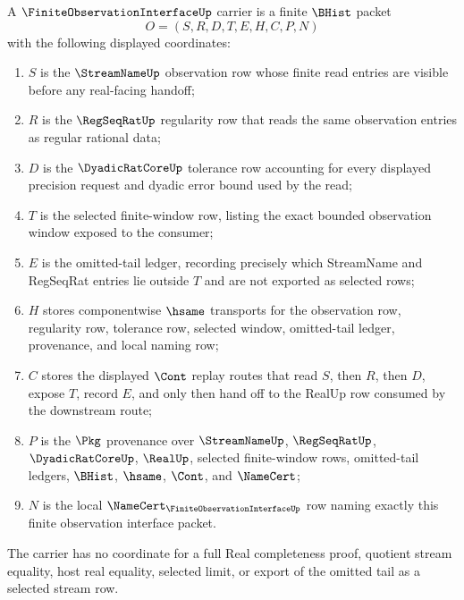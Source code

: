 \begin{definition}
\label{def:finite-observation-interface-carrier}
A $\FiniteObservationInterfaceUp$ carrier is a finite $\BHist$ packet
$$
O=(S,R,D,T,E,H,C,P,N)
$$
with the following displayed coordinates:
\begin{enumerate}
\item $S$ is the $\StreamNameUp$ observation row whose finite read entries are visible before any real-facing handoff;
\item $R$ is the $\RegSeqRatUp$ regularity row that reads the same observation entries as regular rational data;
\item $D$ is the $\DyadicRatCoreUp$ tolerance row accounting for every displayed precision request and dyadic error bound used by the read;
\item $T$ is the selected finite-window row, listing the exact bounded observation window exposed to the consumer;
\item $E$ is the omitted-tail ledger, recording precisely which StreamName and RegSeqRat entries lie outside $T$ and are not exported as selected rows;
\item $H$ stores componentwise $\hsame$ transports for the observation row, regularity row, tolerance row, selected window, omitted-tail ledger, provenance, and local naming row;
\item $C$ stores the displayed $\Cont$ replay routes that read $S$, then $R$, then $D$, expose $T$, record $E$, and only then hand off to the RealUp row consumed by the downstream route;
\item $P$ is the $\Pkg$ provenance over $\StreamNameUp$, $\RegSeqRatUp$, $\DyadicRatCoreUp$, $\RealUp$, selected finite-window rows, omitted-tail ledgers, $\BHist$, $\hsame$, $\Cont$, and $\NameCert$;
\item $N$ is the local $\NameCert_{\FiniteObservationInterfaceUp}$ row naming exactly this finite observation interface packet.
\end{enumerate}
The carrier has no coordinate for a full Real completeness proof, quotient stream equality, host real equality, selected limit, or export of the omitted tail as a selected stream row.
\end{definition}


